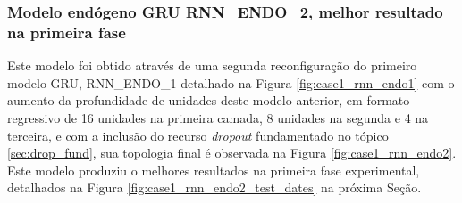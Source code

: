         \subsubsection{Modelo endógeno GRU RNN\_ENDO\_2, melhor resultado na primeira fase}
           Este modelo foi obtido através de uma segunda reconfiguração do primeiro modelo GRU, RNN\_ENDO\_1 detalhado na Figura \ref{fig:case1_rnn_endo1} com o aumento da profundidade de unidades deste modelo anterior, em formato regressivo de 16 unidades na primeira camada, 8 unidades na segunda e 4 na terceira, e com a inclusão do recurso \textit{dropout} fundamentado no tópico \ref{sec:drop_fund}, sua topologia final é observada na Figura \ref{fig:case1_rnn_endo2}. Este modelo produziu o melhores resultados na primeira fase experimental, detalhados na Figura \ref{fig:case1_rnn_endo2_test_dates} na próxima Seção.
            \begin{figure}[H]
            \end{figure}
        
